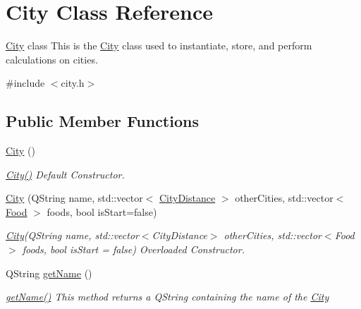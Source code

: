 \hypertarget{class_city}{}\section{City Class Reference}
\label{class_city}


\mbox{\hyperlink{class_city}{City}} class This is the \mbox{\hyperlink{class_city}{City}} class used to instantiate, store, and perform calculations on cities.  




{\ttfamily \#include $<$city.\+h$>$}

\subsection*{Public Member Functions}
\begin{DoxyCompactItemize}
\item 
\mbox{\label{class_city_a1b1f549430f0a7ecd0ec7b1605415193}} 
\mbox{\hyperlink{class_city_a1b1f549430f0a7ecd0ec7b1605415193}{City}} ()
\begin{DoxyCompactList}\small\item\em \mbox{\hyperlink{class_city_a1b1f549430f0a7ecd0ec7b1605415193}{City()}} Default Constructor. \end{DoxyCompactList}\item 
\mbox{\label{class_city_a45f0a3c80b0e4ff9dc33256d2ff5eb0d}} 
\mbox{\hyperlink{class_city_a45f0a3c80b0e4ff9dc33256d2ff5eb0d}{City}} (Q\+String name, std\+::vector$<$ \mbox{\hyperlink{struct_city_distance}{City\+Distance}} $>$ other\+Cities, std\+::vector$<$ \mbox{\hyperlink{class_food}{Food}} $>$ foods, bool is\+Start=false)
\begin{DoxyCompactList}\small\item\em \mbox{\hyperlink{class_city}{City}}(Q\+String name, std\+::vector$<$\+City\+Distance$>$ other\+Cities, std\+::vector$<$\+Food$>$ foods, bool is\+Start = false) Overloaded Constructor. \end{DoxyCompactList}\item 
Q\+String \mbox{\hyperlink{class_city_afe733410d61155d8a4013293b0b72408}{get\+Name}} ()
\begin{DoxyCompactList}\small\item\em \mbox{\hyperlink{class_city_afe733410d61155d8a4013293b0b72408}{get\+Name()}} This method returns a Q\+String containing the name of the \mbox{\hyperlink{class_city}{City}} \end{DoxyCompactList}\item 

\end{DoxyCompactItemize}
